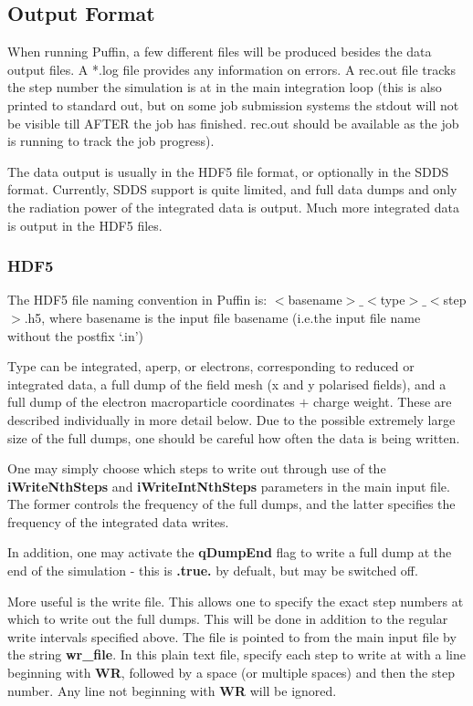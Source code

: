 \documentclass[12pt]{article}%
\begin{document}
\subsection{Output Format}

When running Puffin, a few different files will be produced besides the data output files. A *.log file provides any information on errors. A rec.out file tracks the step number the simulation is at in the main integration loop (this is also printed to standard out, but on some job submission systems the stdout will not be visible till AFTER the job has finished. rec.out should be available as the job is running to track the job progress).

The data output is usually in the HDF5 file format, or optionally in the SDDS format. Currently, SDDS support is quite limited, and full data dumps and only the radiation power of the integrated data is output. Much more integrated data is output in the HDF5 files.

\subsubsection{HDF5}

The HDF5 file naming convention in Puffin is: $<$basename$>\_<$type$>\_<$step$>$.h5, where basename is the input file basename (i.e.the input file name without the postfix `.in')

Type can be integrated, aperp, or electrons, corresponding to reduced or integrated data, a full dump of the field mesh (x and y polarised fields), and a full dump of the electron macroparticle coordinates $+$ charge weight. These are described individually in more detail below. Due to the possible extremely large size of the full dumps, one should be careful how often the data is being written.

One may simply choose which steps to write out through use of the {\bf iWriteNthSteps} and {\bf iWriteIntNthSteps} parameters in the main input file. The former controls the frequency of the full dumps, and the latter specifies the frequency of the integrated data writes.

In addition, one may activate the {\bf qDumpEnd} flag to write a full dump at the end of the simulation - this is {\bf .true.} by defualt, but may be switched off. 

More useful is the write file. This allows one to specify the exact step numbers at which to write out the full dumps. This will be done in addition to the regular write intervals specified above. The file is pointed to from the main input file by the string {\bf wr\_file}. In this plain text file, specify each step to write at with a line beginning with {\bf WR}, followed by a space (or multiple spaces) and then the step number. Any line not beginning with {\bf WR} will be ignored.
\end{document}
